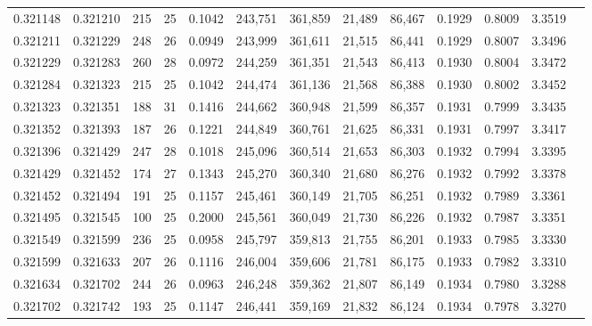 \begin{tabular}{rrrrrrrrrrrrr}
0.321148 & 0.321210 &   215 &  25 &                                     0.1042 & 243,751 & 361,859 &  21,489 &  86,467 & 0.1929 & 0.8009 & 3.3519 \\
0.321211 & 0.321229 &   248 &  26 &                                     0.0949 & 243,999 & 361,611 &  21,515 &  86,441 & 0.1929 & 0.8007 & 3.3496 \\
0.321229 & 0.321283 &   260 &  28 &                                     0.0972 & 244,259 & 361,351 &  21,543 &  86,413 & 0.1930 & 0.8004 & 3.3472 \\
0.321284 & 0.321323 &   215 &  25 &                                     0.1042 & 244,474 & 361,136 &  21,568 &  86,388 & 0.1930 & 0.8002 & 3.3452 \\
0.321323 & 0.321351 &   188 &  31 &                                     0.1416 & 244,662 & 360,948 &  21,599 &  86,357 & 0.1931 & 0.7999 & 3.3435 \\
0.321352 & 0.321393 &   187 &  26 &                                     0.1221 & 244,849 & 360,761 &  21,625 &  86,331 & 0.1931 & 0.7997 & 3.3417 \\
0.321396 & 0.321429 &   247 &  28 &                                     0.1018 & 245,096 & 360,514 &  21,653 &  86,303 & 0.1932 & 0.7994 & 3.3395 \\
0.321429 & 0.321452 &   174 &  27 &                                     0.1343 & 245,270 & 360,340 &  21,680 &  86,276 & 0.1932 & 0.7992 & 3.3378 \\
0.321452 & 0.321494 &   191 &  25 &                                     0.1157 & 245,461 & 360,149 &  21,705 &  86,251 & 0.1932 & 0.7989 & 3.3361 \\
0.321495 & 0.321545 &   100 &  25 &                                     0.2000 & 245,561 & 360,049 &  21,730 &  86,226 & 0.1932 & 0.7987 & 3.3351 \\
0.321549 & 0.321599 &   236 &  25 &                                     0.0958 & 245,797 & 359,813 &  21,755 &  86,201 & 0.1933 & 0.7985 & 3.3330 \\
0.321599 & 0.321633 &   207 &  26 &                                     0.1116 & 246,004 & 359,606 &  21,781 &  86,175 & 0.1933 & 0.7982 & 3.3310 \\
0.321634 & 0.321702 &   244 &  26 &                                     0.0963 & 246,248 & 359,362 &  21,807 &  86,149 & 0.1934 & 0.7980 & 3.3288 \\
0.321702 & 0.321742 &   193 &  25 &                                     0.1147 & 246,441 & 359,169 &  21,832 &  86,124 & 0.1934 & 0.7978 & 3.3270 \\

\end{tabular}
